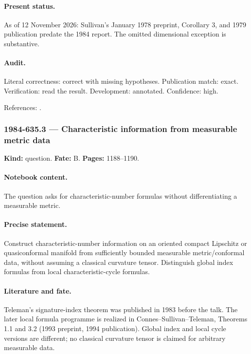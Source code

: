 \paragraph{Present status.} As of 12 November 2026: Sullivan's January 1978 preprint, Corollary 3, and 1979 publication predate the 1984 report. The omitted dimensional exception is substantive.

\paragraph{Audit.} Literal correctness: correct with missing hypotheses. Publication match: exact. Verification: read the result. Development: annotated. Confidence: high.

\noindent References: \citep{sullivan1979hyperbolic}.\par

\subsubsection{1984-635.3 --- Characteristic information from measurable metric data}

\label{item:1984-635.3}

\noindent\textbf{Kind:} question. \textbf{Fate:} B. \textbf{Pages:} 1188--1190.\par

\paragraph{Notebook content.} The question asks for characteristic-number formulas without differentiating a measurable metric.

\paragraph{Precise statement.} Construct characteristic-number information on an oriented compact Lipschitz or quasiconformal manifold from sufficiently bounded measurable metric/conformal data, without assuming a classical curvature tensor. Distinguish global index formulas from local characteristic-cycle formulas.

\paragraph{Literature and fate.} Teleman's signature-index theorem was published in 1983 before the talk. The later local formula programme is realized in Connes--Sullivan--Teleman, Theorems 1.1 and 3.2 (1993 preprint, 1994 publication). Global index and local cycle versions are different; no classical curvature tensor is claimed for arbitrary measurable data.

